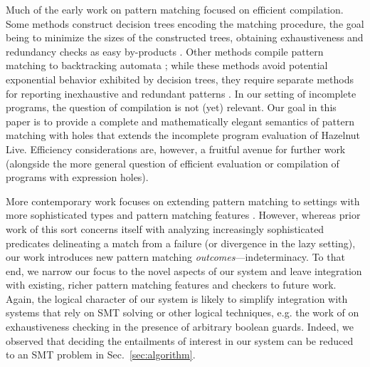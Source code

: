 Much of the early work on pattern matching focused on efficient compilation. Some methods construct decision trees encoding the matching procedure, the goal being to minimize the sizes of the constructed trees, obtaining exhaustiveness and redundancy checks as easy by-products \cite{Aitken92smlnj,Baudinet85treepattern,Sestoft96mlpattern}.
Other methods compile pattern matching to backtracking automata \cite{Maranget94lazybacktracking,DBLP:journals/jfp/Maranget07};
while these methods avoid potential exponential behavior exhibited by decision trees, they require separate methods for reporting inexhaustive and redundant patterns \cite{DBLP:journals/jfp/Maranget07}.
In our setting of incomplete programs, the question of compilation is not (yet) relevant. Our goal in this paper is to provide a complete and mathematically elegant semantics of pattern matching with holes that extends the incomplete program evaluation of Hazelnut Live.  
Efficiency considerations are, however, a fruitful avenue for further work (alongside the more general question of efficient evaluation or compilation of programs with expression holes).

More contemporary work focuses on extending pattern matching to settings with more sophisticated types and pattern matching features \cite{DBLP:conf/icfp/VazouSJVJ14,DBLP:journals/pacmpl/CockxA18,DBLP:conf/itp/Sozeau10,DBLP:conf/icfp/KarachaliasSVJ15,DBLP:journals/pacmpl/GrafJS20}.
However, whereas prior work of this sort concerns itself with analyzing increasingly sophisticated predicates delineating a match from a failure (or divergence in the lazy setting), our work introduces new pattern matching \emph{outcomes}---indeterminacy.
To that end, we narrow our focus to the novel aspects of our system and leave integration with existing, richer pattern matching features and checkers to future work. Again, the logical character of our system is likely to simplify integration with systems that rely on SMT solving or other logical techniques, e.g. the work of \citet{DBLP:journals/pacmpl/GrafJS20} on exhaustiveness checking in the presence of arbitrary boolean guards. Indeed, we observed that deciding the entailments of interest in our system can be reduced to an SMT problem in Sec.~\ref{sec:algorithm}.




